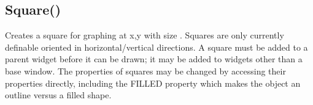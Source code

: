 \documentclass[letterpaper,10pt,english]{sphinxmanual}
\begin{document}
\sphinxAtStartPar
{}

\sphinxAtStartPar
{}

\ignorespaces 

\subsection{Square()}
\label{\detokenize{reference/peblobjects:square}}\label{\detokenize{reference/peblobjects:index-57}}
\sphinxAtStartPar
{}

\sphinxAtStartPar
{}

\sphinxAtStartPar
Creates a square for graphing at x,y with size   . Squares are only currently definable oriented in   horizontal/vertical directions.  A square  must be added   to a parent widget before it can be drawn; it may be added to   widgets other than a base window.  The properties of squares may be   changed by accessing their properties directly, including the FILLED   property which makes the object an outline versus a filled shape.

\sphinxAtStartPar
{}

\begin{sphinxVerbatim}[commandchars=\\\{\}]
\end{sphinxVerbatim}

\sphinxAtStartPar
{}

\begin{sphinxVerbatim}[commandchars=\\\{\}]
\end{sphinxVerbatim}
\end{document}
